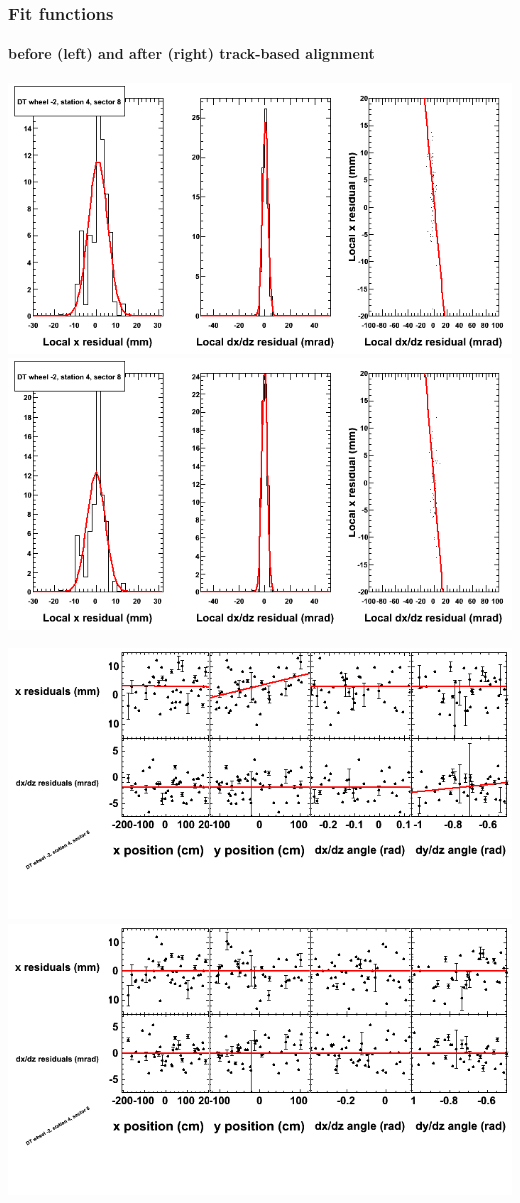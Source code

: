 \documentclass[compress]{beamer}
\begin{document}
\begin{frame}
\frametitle{Fit functions}
\framesubtitle{before (left) and after (right) track-based alignment}
\includegraphics[width=0.5\linewidth]{fitfunctions_re01/MBwhAst4sec08_bellcurves.png} \includegraphics[width=0.5\linewidth]{fitfunctions_re05/MBwhAst4sec08_bellcurves.png}

\includegraphics[width=0.5\linewidth]{fitfunctions_re01/MBwhAst4sec08_polynomials.png} \includegraphics[width=0.5\linewidth]{fitfunctions_re05/MBwhAst4sec08_polynomials.png}
\end{frame}
\end{document}
